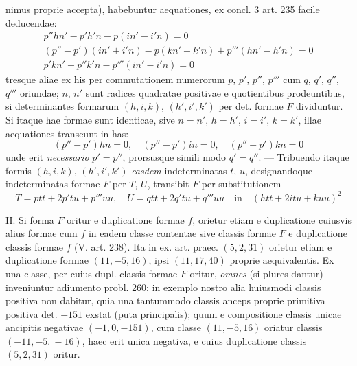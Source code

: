 %
nimus proprie accepta), habebuntur aequationes, ex concl. 3 art. 235 facile deducendae:
\[
\begin{gathered}
p''hn'-p'h'n-p(in'-i'n)=0\\
(p''-p')(in'+i'n)-p(kn'-k'n)+p'''(hn'-h'n)=0\\
p'kn'-p''k'n-p'''(in'-i'n)=0
\end{gathered}
\]
tresque aliae ex his per commutationem numerorum $p$, $p'$, $p''$, $p'''$ cum $q$, $q'$, $q''$, $q'''$ oriundae; $n$, $n'$ sunt radices quadratae positivae e quotientibus prodeuntibus, si determinantes formarum $(h,i,k)$, $(h',i',k')$ per det. formae $F$ dividuntur. Si itaque hae formae sunt identicae, sive $n=n'$, $h=h'$, $i=i'$, $k=k'$, illae aequationes transeunt in has:
\[
(p''-p')hn=0,\quad (p''-p')in=0,\quad (p''-p')kn=0
\]
unde erit \textit{necessario} $p'=p''$, prorsusque simili modo $q'=q''$. --- Tribuendo itaque formis $(h,i,k)$, $(h',i',k')$ \textit{easdem} indeterminatas $t$, $u$, designandoque indeterminatas formae $F$ per $T$, $U$, transibit $F$ per substitutionem
\[
T=ptt+2p'tu+p'''uu,\quad U=qtt+2q'tu+q'''uu\quad\text{in}\quad (htt+2itu+kuu)^2
\]

II. Si forma $F$ oritur e duplicatione formae $f$, orietur etiam e duplicatione cuiusvis alius formae cum $f$ in eadem classe contentae sive classis formae $F$ e duplicatione classis formae $f$ (V. art. 238). Ita in ex. art. praec. $(5,2,31)$ orietur etiam e duplicatione formae $(11,-5,16)$, ipsi $(11,17,40)$ proprie aequivalentis. Ex una classe, per cuius dupl. classis formae $F$ oritur, \textit{omnes} (si plures dantur) inveniuntur adiumento probl. 260; in exemplo nostro alia huiusmodi classis positiva non dabitur, quia una tantummodo classis anceps proprie primitiva positiva det. $-151$ exstat (puta principalis); quum e compositione classis unicae ancipitis negativae $(-1,0,-151)$, cum classe $(11,-5,16)$ oriatur classis $(-11,-5.\ -16)$, haec erit unica negativa, e cuius duplicatione classis $(5,2,31)$ oritur.

